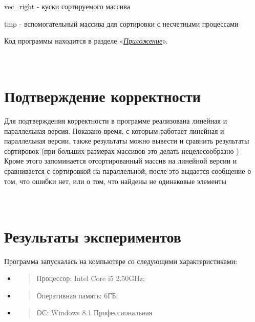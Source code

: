 \documentclass[]{article}
\begin{document}
vec\_right - куски сортируемого массива

tmp - вспомогательный массива для сортировки с несчетными процессами

Код программы находится в разделе
«\protect\hyperlink{_heading=h.3dy6vkm}{\emph{Приложение}}».

\section{\texorpdfstring{\\
Подтверждение
корректности}{ Подтверждение корректности}}\label{ux43fux43eux434ux442ux432ux435ux440ux436ux434ux435ux43dux438ux435-ux43aux43eux440ux440ux435ux43aux442ux43dux43eux441ux442ux438}

Для подтверждения корректности в программе реализована линейная и
параллельная версия. Показано время, с которым работает линейная и
параллельная версии, также результаты можно вывести и сравнить
результаты сортировок (при больших размерах массивов это делать
нецелесообразно )\\
Кроме этого запоминается отсортированный массив на линейной версии и
сравнивается с сортировкой на параллельной, после это выдается сообщение
о том, что ошибки нет, или о том, что найдены не одинаковые элементы

\section{\texorpdfstring{\\
Результаты
экспериментов}{ Результаты экспериментов}}\label{ux440ux435ux437ux443ux43bux44cux442ux430ux442ux44b-ux44dux43aux441ux43fux435ux440ux438ux43cux435ux43dux442ux43eux432}

\protect\hypertarget{_heading=h.tyjcwt}{}{}Программа запускалась на
компьютере со следующими характеристиками:

\begin{itemize}
\item
  \begin{quote}
  Процессор: Intel Core i5 2.50GHz;
  \end{quote}
\item
  \begin{quote}
  Оперативная память: 6ГБ;
  \end{quote}
\item
  \begin{quote}
  ОС: Windows 8.1 Профессиональная
  \end{quote}
\end{itemize}
\end{document}

